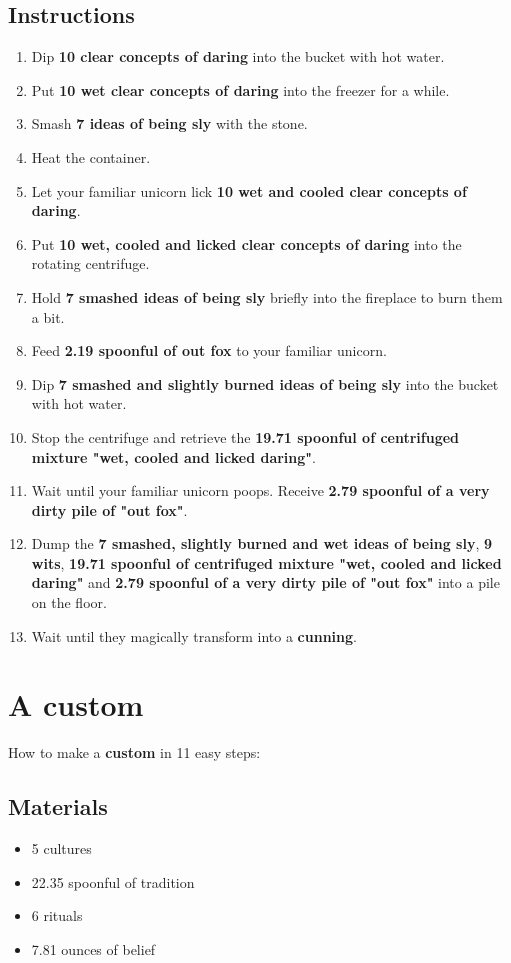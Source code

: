 \documentclass{article}
\begin{document}
\subsection{Instructions}\begin{enumerate}
\item 
Dip \textbf{10 clear concepts of daring} into the bucket with hot water.
\item 
Put \textbf{10 wet clear concepts of daring} into the freezer for a while.
\item 
Smash \textbf{7 ideas of being sly} with the stone.
\item 
Heat the container.
\item 
Let your familiar unicorn lick \textbf{10 wet and cooled clear concepts of daring}.
\item 
Put \textbf{10 wet, cooled and licked clear concepts of daring} into the rotating centrifuge.
\item 
Hold \textbf{7 smashed ideas of being sly} briefly into the fireplace to burn them a bit.
\item 
Feed \textbf{2.19 spoonful of out fox} to your familiar unicorn.
\item 
Dip \textbf{7 smashed and slightly burned ideas of being sly} into the bucket with hot water.
\item 
Stop the centrifuge and retrieve the \textbf{19.71 spoonful of centrifuged mixture "wet, cooled and licked daring"}.
\item 
Wait until your familiar unicorn poops. Receive \textbf{2.79 spoonful of a very dirty pile of "out fox"}.
\item 
Dump the \textbf{7 smashed, slightly burned and wet ideas of being sly}, \textbf{9 wits}, \textbf{19.71 spoonful of centrifuged mixture "wet, cooled and licked daring"} and \textbf{2.79 spoonful of a very dirty pile of "out fox"} into a pile on the floor.
\item 
Wait until they magically transform into a \textbf{cunning}.
\end{enumerate}
\newpage
\section{A custom}How to make a \textbf{custom} in 11 easy steps:

\subsection{Materials}\begin{itemize}
\item 
5 cultures
\item 
22.35 spoonful of tradition
\item 
6 rituals
\item 
7.81 ounces of belief
\end{itemize}
\end{document}
